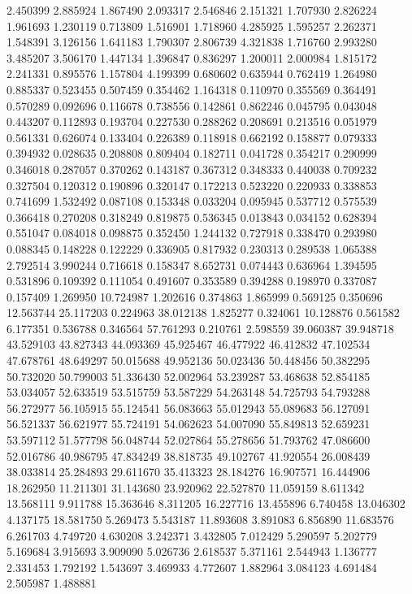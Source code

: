 2.450399
2.885924
1.867490
2.093317
2.546846
2.151321
1.707930
2.826224
1.961693
1.230119
0.713809
1.516901
1.718960
4.285925
1.595257
2.262371
1.548391
3.126156
1.641183
1.790307
2.806739
4.321838
1.716760
2.993280
3.485207
3.506170
1.447134
1.396847
0.836297
1.200011
2.000984
1.815172
2.241331
0.895576
1.157804
4.199399
0.680602
0.635944
0.762419
1.264980
0.885337
0.523455
0.507459
0.354462
1.164318
0.110970
0.355569
0.364491
0.570289
0.092696
0.116678
0.738556
0.142861
0.862246
0.045795
0.043048
0.443207
0.112893
0.193704
0.227530
0.288262
0.208691
0.213516
0.051979
0.561331
0.626074
0.133404
0.226389
0.118918
0.662192
0.158877
0.079333
0.394932
0.028635
0.208808
0.809404
0.182711
0.041728
0.354217
0.290999
0.346018
0.287057
0.370262
0.143187
0.367312
0.348333
0.440038
0.709232
0.327504
0.120312
0.190896
0.320147
0.172213
0.523220
0.220933
0.338853
0.741699
1.532492
0.087108
0.153348
0.033204
0.095945
0.537712
0.575539
0.366418
0.270208
0.318249
0.819875
0.536345
0.013843
0.034152
0.628394
0.551047
0.084018
0.098875
0.352450
1.244132
0.727918
0.338470
0.293980
0.088345
0.148228
0.122229
0.336905
0.817932
0.230313
0.289538
1.065388
2.792514
3.990244
0.716618
0.158347
8.652731
0.074443
0.636964
1.394595
0.531896
0.109392
0.111054
0.491607
0.353589
0.394288
0.198970
0.337087
0.157409
1.269950
10.724987
1.202616
0.374863
1.865999
0.569125
0.350696
12.563744
25.117203
0.224963
38.012138
1.825277
0.324061
10.128876
0.561582
6.177351
0.536788
0.346564
57.761293
0.210761
2.598559
39.060387
39.948718
43.529103
43.827343
44.093369
45.925467
46.477922
46.412832
47.102534
47.678761
48.649297
50.015688
49.952136
50.023436
50.448456
50.382295
50.732020
50.799003
51.336430
52.002964
53.239287
53.468638
52.854185
53.034057
52.633519
53.515759
53.587229
54.263148
54.725793
54.793288
56.272977
56.105915
55.124541
56.083663
55.012943
55.089683
56.127091
56.521337
56.621977
55.724191
54.062623
54.007090
55.849813
52.659231
53.597112
51.577798
56.048744
52.027864
55.278656
51.793762
47.086600
52.016786
40.986795
47.834249
38.818735
49.102767
41.920554
26.008439
38.033814
25.284893
29.611670
35.413323
28.184276
16.907571
16.444906
18.262950
11.211301
31.143680
23.920962
22.527870
11.059159
8.611342
13.568111
9.911788
15.363646
8.311205
16.227716
13.455896
6.740458
13.046302
4.137175
18.581750
5.269473
5.543187
11.893608
3.891083
6.856890
11.683576
6.261703
4.749720
4.630208
3.242371
3.432805
7.012429
5.290597
5.202779
5.169684
3.915693
3.909090
5.026736
2.618537
5.371161
2.544943
1.136777
2.331453
1.792192
1.543697
3.469933
4.772607
1.882964
3.084123
4.691484
2.505987
1.488881
